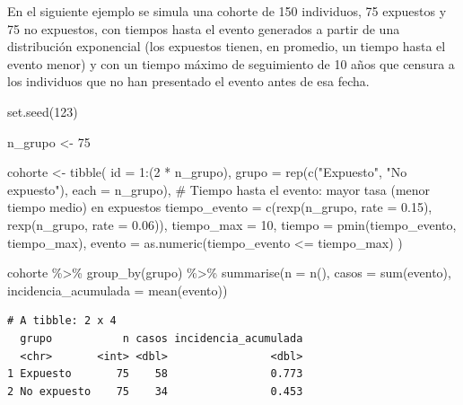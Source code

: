 \documentclass[
  spanish,
  a4paper,
]{scrreport}
\newenvironment{Shaded}{\begin{snugshade}}{\end{snugshade}}
\newcommand{\AttributeTok}[1]{\textcolor[rgb]{0.40,0.45,0.13}{#1}}
\newcommand{\CommentTok}[1]{\textcolor[rgb]{0.37,0.37,0.37}{#1}}
\newcommand{\DecValTok}[1]{\textcolor[rgb]{0.68,0.00,0.00}{#1}}
\newcommand{\FloatTok}[1]{\textcolor[rgb]{0.68,0.00,0.00}{#1}}
\newcommand{\FunctionTok}[1]{\textcolor[rgb]{0.28,0.35,0.67}{#1}}
\newcommand{\NormalTok}[1]{\textcolor[rgb]{0.00,0.23,0.31}{#1}}
\newcommand{\OtherTok}[1]{\textcolor[rgb]{0.00,0.23,0.31}{#1}}
\newcommand{\SpecialCharTok}[1]{\textcolor[rgb]{0.37,0.37,0.37}{#1}}
\newcommand{\StringTok}[1]{\textcolor[rgb]{0.13,0.47,0.30}{#1}}
\theoremstyle{definition}
\theoremstyle{definition}
\theoremstyle{remark}
\begin{document}
En el siguiente ejemplo se simula una cohorte de 150 individuos, 75
expuestos y 75 no expuestos, con tiempos hasta el evento generados a
partir de una distribución exponencial (los expuestos tienen, en
promedio, un tiempo hasta el evento menor) y con un tiempo máximo de
seguimiento de 10 años que censura a los individuos que no han
presentado el evento antes de esa fecha.

\begin{Shaded}
\begin{Highlighting}[]
\FunctionTok{set.seed}\NormalTok{(}\DecValTok{123}\NormalTok{)}

\NormalTok{n\_grupo }\OtherTok{\textless{}{-}} \DecValTok{75}

\NormalTok{cohorte }\OtherTok{\textless{}{-}} \FunctionTok{tibble}\NormalTok{(}
  \AttributeTok{id =} \DecValTok{1}\SpecialCharTok{:}\NormalTok{(}\DecValTok{2} \SpecialCharTok{*}\NormalTok{ n\_grupo),}
  \AttributeTok{grupo =} \FunctionTok{rep}\NormalTok{(}\FunctionTok{c}\NormalTok{(}\StringTok{"Expuesto"}\NormalTok{, }\StringTok{"No expuesto"}\NormalTok{), }\AttributeTok{each =}\NormalTok{ n\_grupo),}
  \CommentTok{\# Tiempo hasta el evento: mayor tasa (menor tiempo medio) en expuestos}
  \AttributeTok{tiempo\_evento =} \FunctionTok{c}\NormalTok{(}\FunctionTok{rexp}\NormalTok{(n\_grupo, }\AttributeTok{rate =} \FloatTok{0.15}\NormalTok{),}
                     \FunctionTok{rexp}\NormalTok{(n\_grupo, }\AttributeTok{rate =} \FloatTok{0.06}\NormalTok{)),}
  \AttributeTok{tiempo\_max =} \DecValTok{10}\NormalTok{,}
  \AttributeTok{tiempo =} \FunctionTok{pmin}\NormalTok{(tiempo\_evento, tiempo\_max),}
  \AttributeTok{evento =} \FunctionTok{as.numeric}\NormalTok{(tiempo\_evento }\SpecialCharTok{\textless{}=}\NormalTok{ tiempo\_max)}
\NormalTok{)}

\NormalTok{cohorte }\SpecialCharTok{\%\textgreater{}\%}
  \FunctionTok{group\_by}\NormalTok{(grupo) }\SpecialCharTok{\%\textgreater{}\%}
  \FunctionTok{summarise}\NormalTok{(}\AttributeTok{n =} \FunctionTok{n}\NormalTok{(),}
            \AttributeTok{casos =} \FunctionTok{sum}\NormalTok{(evento),}
            \AttributeTok{incidencia\_acumulada =} \FunctionTok{mean}\NormalTok{(evento))}
\end{Highlighting}
\end{Shaded}

\begin{verbatim}
# A tibble: 2 x 4
  grupo           n casos incidencia_acumulada
  <chr>       <int> <dbl>                <dbl>
1 Expuesto       75    58                0.773
2 No expuesto    75    34                0.453
\end{verbatim}
\end{document}
